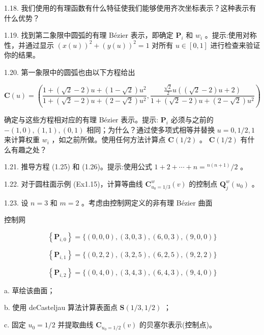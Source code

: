 \documentclass[../main.tex]{subfiles}
\begin{document}
1.18. 我们使用的有理函数有什么特征使我们能够使用齐次坐标表示？这种表示有什么优势？

1.19. 找到第二象限中圆弧的有理 Bézier 表示，即确定 \({\mathbf{P}}_{i}\) 和 \({w}_{i}\) 。提示:使用对称性，并通过显示 \({\left( x\left( u\right) \right) }^{2} + {\left( y\left( u\right) \right) }^{2} = 1\) 对所有 \(u \in  \left\lbrack  {0,1}\right\rbrack\) 进行检查来验证你的结果。

1.20. 第一象限中的圆弧也由以下方程给出

\[
\mathbf{C}\left( u\right)  = \left( {\frac{1 + \left( {\sqrt{2} - 2}\right) u + \left( {1 - \sqrt{2}}\right) {u}^{2}}{1 + \left( {\sqrt{2} - 2}\right) u + \left( {2 - \sqrt{2}}\right) {u}^{2}},\frac{\frac{\sqrt{2}}{2}u\left( {\left( {\sqrt{2} - 2}\right) u + 2}\right) }{1 + \left( {\sqrt{2} - 2}\right) u + \left( {2 - \sqrt{2}}\right) {u}^{2}}}\right)
\]

确定与这些方程相对应的有理 Bézier 表示。提示: \({\mathbf{P}}_{i}\) 必须与之前的 \(- \left( {1,0}\right) ,\left( {1,1}\right) ,\left( {0,1}\right)\) 相同；为什么？通过使多项式相等并替换 \(u = 0,1/2,1\) 来计算权重 \({w}_{i}\) ，如之前所做。使用任何方法计算点 \(\mathbf{C}\left( {1/2}\right)\) 。 \(\mathbf{C}\left( {1/2}\right)\) 有什么有趣之处？

1.21. 推导方程 (1.25) 和 (1.26)。提示:使用公式 \(1 + 2 + \cdots  + n = {}^{n\left( {n + 1}\right) }/2\) 。

1.22. 对于圆柱面示例 (Ex1.15)，计算等曲线 \({\mathbf{C}}_{{u}_{0} = 1/3}^{w}\left( v\right)\) 的控制点 \({\mathbf{Q}}_{j}^{w}\left( {u}_{0}\right)\) 。

1.23. 设 \(n = 3\) 和 \(m = 2\) 。考虑由控制网定义的非有理 Bézier 曲面

控制网

\[
\left\{  {\mathbf{P}}_{i,0}\right\}   = \{ \left( {0,0,0}\right) ,\left( {3,0,3}\right) ,\left( {6,0,3}\right) ,\left( {9,0,0}\right) \}
\]

\[
\left\{  {\mathbf{P}}_{i,1}\right\}   = \{ \left( {0,2,2}\right) ,\left( {3,2,5}\right) ,\left( {6,2,5}\right) ,\left( {9,2,2}\right) \}
\]

\[
\left\{  {\mathbf{P}}_{i,2}\right\}   = \{ \left( {0,4,0}\right) ,\left( {3,4,3}\right) ,\left( {6,4,3}\right) ,\left( {9,4,0}\right) \}
\]

a. 草绘该曲面；

b. 使用 deCasteljau 算法计算表面点 \(\mathbf{S}\left( {1/3,1/2}\right)\) ；

c. 固定 \({u}_{0} = 1/2\) 并提取曲线 \({\mathbf{C}}_{{u}_{0} = 1/2}\left( v\right)\) 的贝塞尔表示(控制点)。
\end{document}

